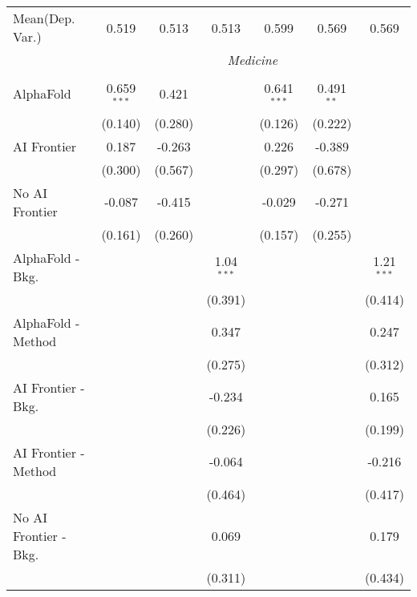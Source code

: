 \begin{tabular}{lcccccc}
Mean(Dep. Var.) & 0.519 & 0.513 & 0.513 & 0.599 & 0.569 & 0.569 \\
 & \multicolumn{6}{c}{\textit{Medicine}} \\ \\
   AlphaFold               & 0.659$^{***}$ & 0.421   &              & 0.641$^{***}$ & 0.491$^{**}$ &   \\   
                           & (0.140)       & (0.280) &              & (0.126)       & (0.222)      &   \\   
   AI Frontier             & 0.187         & -0.263  &              & 0.226         & -0.389       &   \\   
                           & (0.300)       & (0.567) &              & (0.297)       & (0.678)      &   \\   
   No AI Frontier          & -0.087        & -0.415  &              & -0.029        & -0.271       &   \\   
                           & (0.161)       & (0.260) &              & (0.157)       & (0.255)      &   \\   
   AlphaFold - Bkg.        &               &         & 1.04$^{***}$ &               &              & 1.21$^{***}$\\   
                           &               &         & (0.391)      &               &              & (0.414)\\   
   AlphaFold - Method      &               &         & 0.347        &               &              & 0.247\\   
                           &               &         & (0.275)      &               &              & (0.312)\\   
   AI Frontier - Bkg.      &               &         & -0.234       &               &              & 0.165\\   
                           &               &         & (0.226)      &               &              & (0.199)\\   
   AI Frontier - Method    &               &         & -0.064       &               &              & -0.216\\   
                           &               &         & (0.464)      &               &              & (0.417)\\   
   No AI Frontier - Bkg.   &               &         & 0.069        &               &              & 0.179\\   
                           &               &         & (0.311)      &               &              & (0.434)\\   

\end{tabular}
